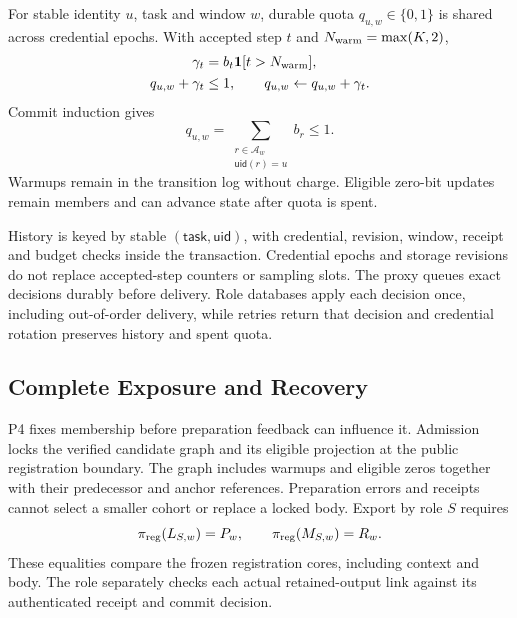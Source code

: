 \documentclass[conference,compsoc]{IEEEtran}
\theoremstyle{definition}
\numberwithin{equation}{section}
\numberwithin{table}{section}
\numberwithin{figure}{section}
\theoremstyle{plain}
\begin{document}
For stable identity \(u\), task and window \(w\), durable quota
\(q_{u,w}\in\{0,1\}\) is shared across credential epochs. With accepted step
\(t\) and \(N_{\rm warm}=\max(K,2)\),
\begin{equation}
\begin{aligned}
\gamma_t&=b_t\mathbf1[t>N_{\rm warm}],\\
q_{u,w}+\gamma_t&\le1,\qquad
q_{u,w}\gets q_{u,w}+\gamma_t.
\end{aligned}
\label{eq:window-quota}
\end{equation}
Commit induction gives
\begin{equation}
q_{u,w}=\sum_{\substack{r\in\mathcal A_w\\\mathsf{uid}(r)=u}} b_r\le1.
\label{eq:quota-invariant}
\end{equation}
Warmups remain in the transition log without charge. Eligible zero-bit updates
remain members and can advance state after quota is spent.

History is keyed by stable \((\mathsf{task},\mathsf{uid})\), with credential, revision, window, receipt and budget checks inside the transaction. Credential epochs and storage revisions do not replace accepted-step counters or sampling slots. The proxy queues exact decisions durably before delivery. Role databases apply each decision once, including out-of-order delivery, while retries return that decision and credential rotation preserves history and spent quota.

\subsection{Complete Exposure and Recovery}
\label{sec:finalization}
\label{sec:strict-choice}
P4 fixes membership before preparation feedback can influence it. Admission
locks the verified candidate graph and its eligible projection at the public
registration boundary. The graph includes warmups and eligible zeros together
with their predecessor and anchor references. Preparation errors and receipts cannot select a smaller cohort or replace
a locked body. Export by role \(S\) requires
\begin{equation}
 \pi_{\rm reg}(L_{S,w})=P_w,\qquad \pi_{\rm reg}(M_{S,w})=R_w.
 \label{eq:final-report-set}
\end{equation}
These equalities compare the frozen registration cores, including context and
body. The role separately checks each actual retained-output link against its
authenticated receipt and commit decision.
\end{document}
